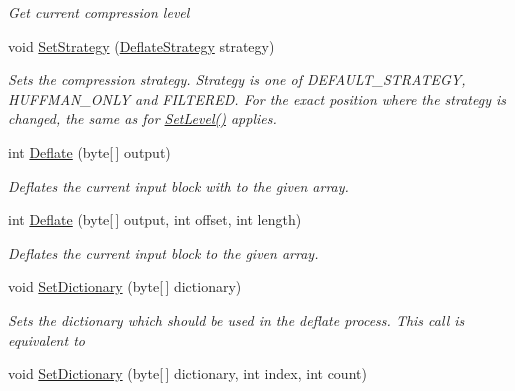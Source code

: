 \begin{DoxyCompactItemize}
\begin{DoxyCompactList}\small\item\em Get current compression level \end{DoxyCompactList}\item 
void \hyperlink{class_i_c_sharp_code_1_1_sharp_zip_lib_1_1_zip_1_1_compression_1_1_deflater_a1d3cf927ab2a1e6c6a477d9e2d2a1e93}{Set\+Strategy} (\hyperlink{namespace_i_c_sharp_code_1_1_sharp_zip_lib_1_1_zip_1_1_compression_a922c175879503e6b9e35641deccfbc40}{Deflate\+Strategy} strategy)
\begin{DoxyCompactList}\small\item\em Sets the compression strategy. Strategy is one of D\+E\+F\+A\+U\+L\+T\+\_\+\+S\+T\+R\+A\+T\+E\+GY, H\+U\+F\+F\+M\+A\+N\+\_\+\+O\+N\+LY and F\+I\+L\+T\+E\+R\+ED. For the exact position where the strategy is changed, the same as for \hyperlink{class_i_c_sharp_code_1_1_sharp_zip_lib_1_1_zip_1_1_compression_1_1_deflater_aeec1f91af74741790108b3af8f877b5e}{Set\+Level()} applies. \end{DoxyCompactList}\item 
int \hyperlink{class_i_c_sharp_code_1_1_sharp_zip_lib_1_1_zip_1_1_compression_1_1_deflater_a68958680d1f6cdaef83e705908e5c082}{Deflate} (byte\mbox{[}$\,$\mbox{]} output)
\begin{DoxyCompactList}\small\item\em Deflates the current input block with to the given array. \end{DoxyCompactList}\item 
int \hyperlink{class_i_c_sharp_code_1_1_sharp_zip_lib_1_1_zip_1_1_compression_1_1_deflater_a1611ccb20064abb42667e5cbf7b98c4a}{Deflate} (byte\mbox{[}$\,$\mbox{]} output, int offset, int length)
\begin{DoxyCompactList}\small\item\em Deflates the current input block to the given array. \end{DoxyCompactList}\item 
void \hyperlink{class_i_c_sharp_code_1_1_sharp_zip_lib_1_1_zip_1_1_compression_1_1_deflater_a37d15527b9581210462405f0d6fc05f9}{Set\+Dictionary} (byte\mbox{[}$\,$\mbox{]} dictionary)
\begin{DoxyCompactList}\small\item\em Sets the dictionary which should be used in the deflate process. This call is equivalent to \end{DoxyCompactList}\item 
void \hyperlink{class_i_c_sharp_code_1_1_sharp_zip_lib_1_1_zip_1_1_compression_1_1_deflater_a32ef3ee267c15d7a292d6e992c435160}{Set\+Dictionary} (byte\mbox{[}$\,$\mbox{]} dictionary, int index, int count)

\end{DoxyCompactItemize}
